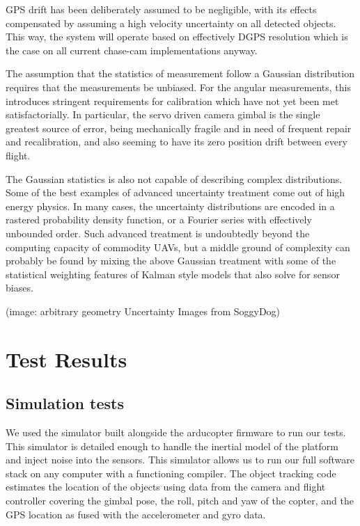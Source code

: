 \documentclass[a4paper, 11pt, titlepage]{article}
\begin{document}
      GPS drift has been deliberately assumed to be negligible, with its effects compensated by assuming a high velocity uncertainty on all detected objects.  This way, the system will operate based on effectively DGPS resolution which is the case on all current chase-cam implementations anyway.

      The assumption that the statistics of measurement follow a Gaussian distribution requires that the measurements be unbiased.  For the angular measurements, this introduces stringent requirements for calibration which have not yet been met satisfactorially.  In particular, the servo driven camera gimbal is the single greatest source of error, being mechanically fragile and in need of frequent repair and recalibration, and also seeming to have its zero position drift between every flight.

      The Gaussian statistics is also not capable of describing complex distributions.  Some of the best examples of advanced uncertainty treatment come out of high energy physics.  In many cases, the uncertainty distributions are encoded in a rastered probability density function, or a Fourier series with effectively unbounded order.  Such advanced treatment is undoubtedly beyond the computing capacity of commodity UAVs, but a middle ground of complexity can probably be found by mixing the above Gaussian treatment with some of the statistical weighting features of Kalman style models that also solve for sensor biases.

        (image: arbitrary geometry Uncertainty Images from SoggyDog)

      


\section{Test Results}

  \subsection{Simulation tests}
    We used the simulator built alongside the arducopter firmware to run our tests.  This simulator is detailed enough to handle the inertial model of the platform and inject noise into the sensors.
    This simulator allows us to run our full software stack on any computer with a functioning compiler.
    The object tracking code estimates the location of the objects using data from the camera and flight controller covering the gimbal pose, the roll, pitch and yaw of the copter, and the GPS location as fused with the accelerometer and gyro data.
\end{document}
